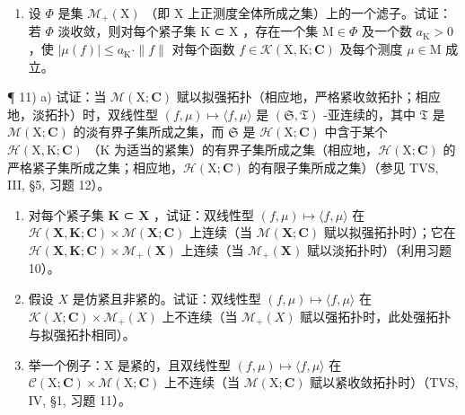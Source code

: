 \begin{enumerate}
\def\labelenumi{\arabic{enumi})}
\setcounter{enumi}{9}
\tightlist
\item
  设 \(\Phi\) 是集 \(\mathcal{M}_{+}(\mathrm{X})\) （即 \(\mathrm{X}\) 上正测度全体所成之集）上的一个滤子。试证：若 \(\Phi\) 淡收敛，则对每个紧子集 \(\mathrm{K}\) ⊂ \(\mathrm{X}\) ，存在一个集 \(\mathrm{M} \in \Phi\) 及一个数 \(a_{\mathrm{K}} > 0\) ，使 \(|\mu(f)| \leqslant a_{\mathrm{K}} \cdot \|f\|\) 对每个函数 \(f \in \mathcal{K}(\mathrm{X}, \mathrm{K}; \mathbf{C})\) 及每个测度 \(\mu \in \mathrm{M}\) 成立。
\end{enumerate}

¶ 11) a) 试证：当 \(\mathcal{M}(\mathrm{X};\mathbf{C})\) 赋以拟强拓扑（相应地，严格紧收敛拓扑；相应地，淡拓扑）时，双线性型 \((f,\mu)\mapsto\langle f,\mu\rangle\) 是 \((\mathfrak{S},\mathfrak{T})\) -亚连续的，其中 \(\mathfrak{T}\) 是 \(\mathcal{M}(\mathrm{X};\mathbf{C})\) 的淡有界子集所成之集，而 \(\mathfrak{S}\) 是 \(\mathcal{H}(\mathrm{X};\mathbf{C})\) 中含于某个 \(\mathcal{H}(\mathrm{X},\mathrm{K};\mathbf{C})\) （K 为适当的紧集）的有界子集所成之集（相应地，\(\mathcal{H}(\mathrm{X};\mathbf{C})\) 的严格紧子集所成之集；相应地，\(\mathcal{H}(\mathrm{X};\mathbf{C})\) 的有限子集所成之集）（参见 TVS, III, §5, 习题 12）。

\begin{enumerate}
\def\labelenumi{\alph{enumi})}
\setcounter{enumi}{1}
\item
  对每个紧子集 \(\mathbf{K}\) ⊂ \(\mathbf{X}\) ，试证：双线性型 \((f, \mu) \mapsto \langle f, \mu \rangle\) 在 \(\mathcal{H}(\mathbf{X}, \mathbf{K}; \mathbf{C}) \times \mathcal{M}(\mathbf{X}; \mathbf{C})\) 上连续（当 \(\mathcal{M}(\mathbf{X}; \mathbf{C})\) 赋以拟强拓扑时）；它在 \(\mathcal{H}(\mathbf{X}, \mathbf{K}; \mathbf{C}) \times \mathcal{M}_{+}(\mathbf{X})\) 上连续（当 \(\mathcal{M}_{+}(\mathbf{X})\) 赋以淡拓扑时）（利用习题 10）。
\item
  假设 \(X\) 是仿紧且非紧的。试证：双线性型 \((f, \mu) \mapsto \langle f, \mu \rangle\) 在 \(\mathcal{K}(X; \mathbf{C}) \times \mathcal{M}_{+}(X)\) 上不连续（当 \(\mathcal{M}_{+}(X)\) 赋以强拓扑时，此处强拓扑与拟强拓扑相同）。
\item
  举一个例子：X 是紧的，且双线性型 \((f,\mu)\mapsto\langle f,\mu\rangle\) 在 \(\mathcal{C}(\mathrm{X};\mathbf{C})\times\mathcal{M}(\mathrm{X};\mathbf{C})\) 上不连续（当 \(\mathcal{M}(\mathrm{X};\mathbf{C})\) 赋以紧收敛拓扑时）（TVS, IV, §1, 习题 11）。
\end{enumerate}

